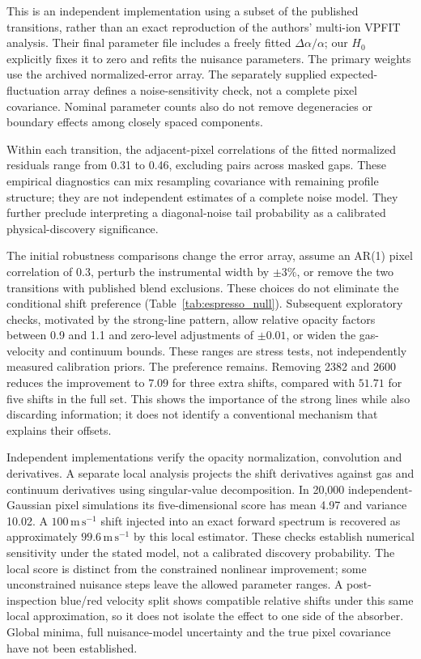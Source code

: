 This is an independent implementation using a subset of the published transitions, rather than an exact reproduction of the authors' multi-ion VPFIT analysis. Their final parameter file includes a freely fitted $\Delta\alpha/\alpha$; our $H_0$ explicitly fixes it to zero and refits the nuisance parameters. The primary weights use the archived normalized-error array. The separately supplied expected-fluctuation array defines a noise-sensitivity check, not a complete pixel covariance. Nominal parameter counts also do not remove degeneracies or boundary effects among closely spaced components.

Within each transition, the adjacent-pixel correlations of the fitted normalized residuals range from 0.31 to 0.46, excluding pairs across masked gaps. These empirical diagnostics can mix resampling covariance with remaining profile structure; they are not independent estimates of a complete noise model. They further preclude interpreting a diagonal-noise tail probability as a calibrated physical-discovery significance.

The initial robustness comparisons change the error array, assume an AR(1) pixel correlation of 0.3, perturb the instrumental width by $\pm3\%$, or remove the two transitions with published blend exclusions. These choices do not eliminate the conditional shift preference (Table~\ref{tab:espresso_null}). Subsequent exploratory checks, motivated by the strong-line pattern, allow relative opacity factors between 0.9 and 1.1 and zero-level adjustments of $\pm0.01$, or widen the gas-velocity and continuum bounds. These ranges are stress tests, not independently measured calibration priors. The preference remains. Removing 2382 and 2600 reduces the improvement to $7.09$ for three extra shifts, compared with $51.71$ for five shifts in the full set. This shows the importance of the strong lines while also discarding information; it does not identify a conventional mechanism that explains their offsets.

Independent implementations verify the opacity normalization, convolution and derivatives. A separate local analysis projects the shift derivatives against gas and continuum derivatives using singular-value decomposition. In 20,000 independent-Gaussian pixel simulations its five-dimensional score has mean 4.97 and variance 10.02. A $100\,\mathrm{m\,s^{-1}}$ shift injected into an exact forward spectrum is recovered as approximately $99.6\,\mathrm{m\,s^{-1}}$ by this local estimator. These checks establish numerical sensitivity under the stated model, not a calibrated discovery probability. The local score is distinct from the constrained nonlinear improvement; some unconstrained nuisance steps leave the allowed parameter ranges. A post-inspection blue/red velocity split shows compatible relative shifts under this same local approximation, so it does not isolate the effect to one side of the absorber. Global minima, full nuisance-model uncertainty and the true pixel covariance have not been established.

